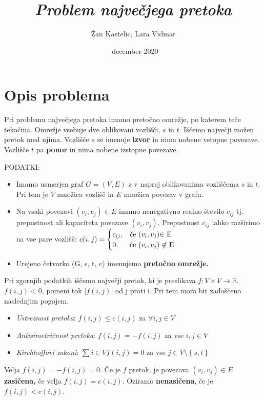 \documentclass[a4paper]{article}
\title{\textit{Problem največjega pretoka}}
\author{Žan Kastelic, Lara Vidmar}
\date{~december 2020}
\begin{document}
\begin{titlepage}
 \maketitle

\end{titlepage}

\section{Opis problema}
Pri problemu največjega pretoka imamo pretočno omrežje, po katerem teče tekočina. Omrežje vsebuje dve oblikovani vozlišči, $s$ in $t$. Iščemo največji možen pretok med njima. Vozlišče $s$ se imenuje \textbf{izvor} in nima nobene vstopne povezave. Vozlišče $t$ pa \textbf{ponor} in nima nobene izstopne povezave.

PODATKI: 
\begin{itemize}
\item Imamo usmerjen graf $G = (V, E)$ z v naprej oblikovanima vozliščema $s $ in $t.$ Pri tem je $V$ množica vozlišč in $E$ množica povezav v grafu.
\item Na vsaki povezavi $(v_i, v_j) \in E$ imamo nenegativno realno število $c_{ij}$ tj. prepustnost ali kapaciteta povezave $(v_i, v_j).$ Prepustnost $c_{ij}$ lahko razširimo na vse pare vozlišč:  $c(i, j) = \begin{cases} c_{ij}, & \mbox{če }(v_i, v_j)\mbox{$ \in$ E} \\ 0, & \mbox{če }(v_i, v_j)\mbox{ $\not\in$ E} \end{cases}$
\item Urejeno četvorko (G, s, t, c) imenujemo \textbf{pretočno omrežje.}
\end{itemize}

Pri zgornjih podatkih iščemo največji pretok, ki je preslikava $f: V \times V \rightarrow \mathbb{R}.$ $f(i,j) < 0$, pomeni tok $|f(i,j)|$ od j proti i. Pri tem mora bit zadoščeno naslednjim pogojem. 
\begin{itemize}
\item \textit{Ustreznost pretoka}:  $f(i, j) \le c(i, j) $ za $\forall i, j \in V$
\item \textit{Antisimetričnost pretoka}: $f(i, j) = - f(i, j)$ za vse $i, j \in V$
\item \textit{Kirchhoffovi zakoni}: $\sum i \in V f(i, j) = 0 $ za vse $j \in V \setminus  \left \{ s, t \right \}$ 
\end{itemize}
Velja $f(i, j) = - f(i,j) = 0. $
Če je $f$ pretok, je povezava $(v_i, v_j) \in E$ \textbf{zasičena,} če velja $f(i,j) = c(i,j).$ Oziramo \textbf{nenasičena}, če je $f(i,j) < c(i,j).$ 
\end{document}
